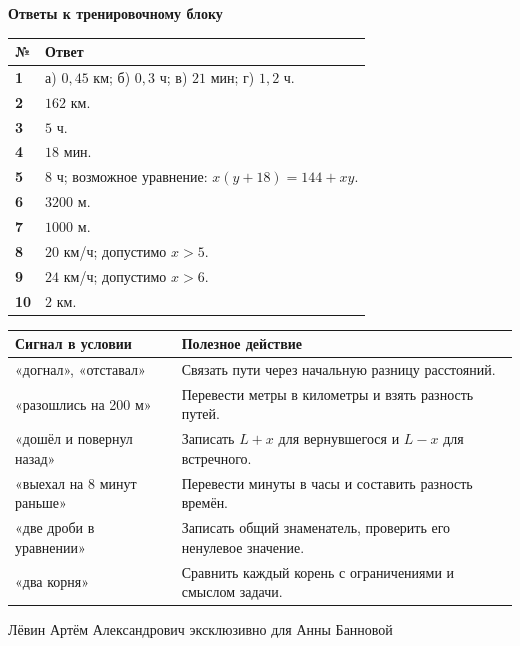\documentclass[a4paper,12pt]{article}
\newcommand{\topic}[1]{\vspace{7pt}{\large\bfseries\color{darkaccent}#1}\par\vspace{2pt}}
\begin{document}
\clearpage
\begin{center}{\LARGE\color{darkaccent}\bfseries Ответы к тренировочному блоку}\end{center}
\vspace{9mm}
\renewcommand{\arraystretch}{1.65}
\begin{tabularx}{\linewidth}{@{}>{\bfseries}p{.08\linewidth}X@{}}
\toprule
№ & Ответ\\
\midrule
1 & а) $0{,}45$ км; б) $0{,}3$ ч; в) $21$ мин; г) $1{,}2$ ч.\\
2 & $162$ км.\\
3 & $5$ ч.\\
4 & $18$ мин.\\
5 & $8$ ч; возможное уравнение: $x(y+18)=144+xy$.\\
6 & $3200$ м.\\
7 & $1000$ м.\\
8 & $20$ км/ч; допустимо $x>5$.\\
9 & $24$ км/ч; допустимо $x>6$.\\
10 & $2$ км.\\
\bottomrule
\end{tabularx}
\vspace{11mm}
\topic{Краткая памятка}
\begin{tabularx}{\linewidth}{@{}p{.29\linewidth}X@{}}
\toprule
Сигнал в условии & Полезное действие\\\midrule
«догнал», «отставал» & Связать пути через начальную разницу расстояний.\\
«разошлись на 200 м» & Перевести метры в километры и взять разность путей.\\
«дошёл и повернул назад» & Записать $L+x$ для вернувшегося и $L-x$ для встречного.\\
«выехал на 8 минут раньше» & Перевести минуты в часы и составить разность времён.\\
«две дроби в уравнении» & Записать общий знаменатель, проверить его ненулевое значение.\\
«два корня» & Сравнить каждый корень с ограничениями и смыслом задачи.\\
\bottomrule
\end{tabularx}
\vfill
\begin{center}{\footnotesize\color{grayink}Лёвин Артём Александрович эксклюзивно для Анны Банновой}\end{center}
\end{document}
